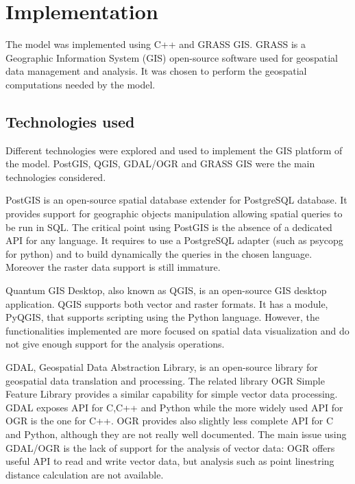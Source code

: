 \documentclass[12pt,a4paper,twoside]{book}
\begin{document}
\chapter{Implementation}\label{implementation}
The model was implemented using C++ and GRASS GIS. GRASS is a Geographic Information System (GIS) open-source software used for geospatial data management and analysis. It was chosen to perform the geospatial computations needed by the model.

\section{Technologies used}
Different technologies were explored and used to implement the GIS platform of the model. PostGIS, QGIS, GDAL/OGR and GRASS GIS were the main technologies considered.

PostGIS is an open-source spatial database extender for PostgreSQL database. It provides support for geographic objects manipulation allowing spatial queries to be run in SQL. The critical point using PostGIS is the absence of a dedicated API for any language. It requires to use a PostgreSQL adapter (such as psycopg for python) and to build dynamically the queries in the chosen language. Moreover the raster data support is still immature.

Quantum GIS Desktop, also known as QGIS, is an open-source GIS desktop application. QGIS supports both vector and raster formats. It has a module, PyQGIS, that supports scripting using the Python language. However, the functionalities implemented are more focused on spatial data visualization and do not give enough support for the analysis operations.

GDAL, Geospatial Data Abstraction Library, is an open-source library for geospatial data translation and processing. The related library OGR Simple Feature Library provides a similar capability for simple vector data processing. GDAL exposes API for C,C++ and Python while the more widely used API for OGR is the one for C++. OGR provides also slightly less complete API for C and Python, although they are not really well documented. The main issue using GDAL/OGR is the lack of support for the analysis of vector data: OGR offers useful API to read and write vector data, but analysis such as point linestring distance calculation are not available.
\end{document}
